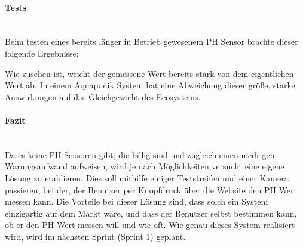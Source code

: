 \documentclass[11pt]{article}
\begin{document}
\paragraph{Tests} \mbox{} \\
Beim testen eines bereits l\"anger in Betrieb gewesenem PH Sensor brachte dieser folgende Ergebnisse: \\
\begin{minipage}{5in}
  \centering
\end{minipage}
Wie zusehen ist, weicht der gemessene Wert bereits stark von dem eigentlichen Wert ab. In einem Aquaponik System hat eine Abweichung dieser gr\"o{\ss}e, starke Auswirkungen auf das Gleichgewicht des Ecosystems. \\
\paragraph{Fazit} \mbox{} \\
Da es keine PH Sensoren gibt, die billig sind und zugleich einen niedrigen Warungsaufwand aufweisen, wird je nach M\"oglichkeiten versucht eine eigene L\"osung zu etablieren. Dies soll mithilfe einiger Teststreifen und einer Kamera passieren, bei der, der Benutzer per Knopfdruck \"uber die Website den PH Wert messen kann. Die Vorteile bei dieser L\"osung sind, dass solch ein System einzigartig auf dem Markt w\"are, und dass der Benutzer selbst bestimmen kann, ob er den PH Wert messen will und wie oft. Wie genau dieses System realisiert wird, wird im n\"achsten Sprint (Sprint 1) geplant.
\end{document}
